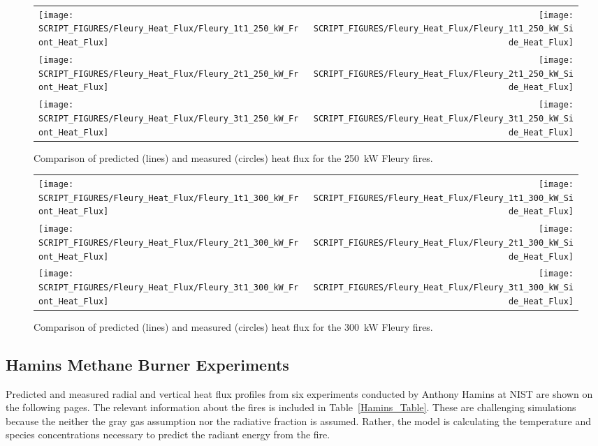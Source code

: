 \begin{figure}[p]
\begin{tabular*}{\textwidth}{l@{\extracolsep{\fill}}r}
\texttt{[image: SCRIPT\_FIGURES/Fleury\_Heat\_Flux/Fleury\_1t1\_250\_kW\_Front\_Heat\_Flux]} &
\texttt{[image: SCRIPT\_FIGURES/Fleury\_Heat\_Flux/Fleury\_1t1\_250\_kW\_Side\_Heat\_Flux]} \\
\texttt{[image: SCRIPT\_FIGURES/Fleury\_Heat\_Flux/Fleury\_2t1\_250\_kW\_Front\_Heat\_Flux]} &
\texttt{[image: SCRIPT\_FIGURES/Fleury\_Heat\_Flux/Fleury\_2t1\_250\_kW\_Side\_Heat\_Flux]} \\
\texttt{[image: SCRIPT\_FIGURES/Fleury\_Heat\_Flux/Fleury\_3t1\_250\_kW\_Front\_Heat\_Flux]} &
\texttt{[image: SCRIPT\_FIGURES/Fleury\_Heat\_Flux/Fleury\_3t1\_250\_kW\_Side\_Heat\_Flux]}
\end{tabular*}
\label{Fleury_Heat_Flux_250_kW}
\caption[Fleury Heat Flux, 250 kW fires.]
{Comparison of predicted (lines) and measured (circles) heat flux for the 250~kW Fleury fires.}
\end{figure}

\begin{figure}[p]
\begin{tabular*}{\textwidth}{l@{\extracolsep{\fill}}r}
\texttt{[image: SCRIPT\_FIGURES/Fleury\_Heat\_Flux/Fleury\_1t1\_300\_kW\_Front\_Heat\_Flux]} &
\texttt{[image: SCRIPT\_FIGURES/Fleury\_Heat\_Flux/Fleury\_1t1\_300\_kW\_Side\_Heat\_Flux]} \\
\texttt{[image: SCRIPT\_FIGURES/Fleury\_Heat\_Flux/Fleury\_2t1\_300\_kW\_Front\_Heat\_Flux]} &
\texttt{[image: SCRIPT\_FIGURES/Fleury\_Heat\_Flux/Fleury\_2t1\_300\_kW\_Side\_Heat\_Flux]} \\
\texttt{[image: SCRIPT\_FIGURES/Fleury\_Heat\_Flux/Fleury\_3t1\_300\_kW\_Front\_Heat\_Flux]} &
\texttt{[image: SCRIPT\_FIGURES/Fleury\_Heat\_Flux/Fleury\_3t1\_300\_kW\_Side\_Heat\_Flux]}
\end{tabular*}
\label{Fleury_Heat_Flux_300_kW}
\caption[Fleury Heat Flux, 300 kW fires.]
{Comparison of predicted (lines) and measured (circles) heat flux for the 300~kW Fleury fires.}
\end{figure}

\clearpage

\subsection{Hamins Methane Burner Experiments}

Predicted and measured radial and vertical heat flux profiles from six experiments conducted by Anthony Hamins at NIST are shown on the following pages. The relevant information about the fires is included in Table~\ref{Hamins_Table}. These are challenging simulations because the neither the gray gas assumption nor the radiative fraction is assumed. Rather, the model is calculating the temperature and species concentrations necessary to predict the radiant energy from the fire.

